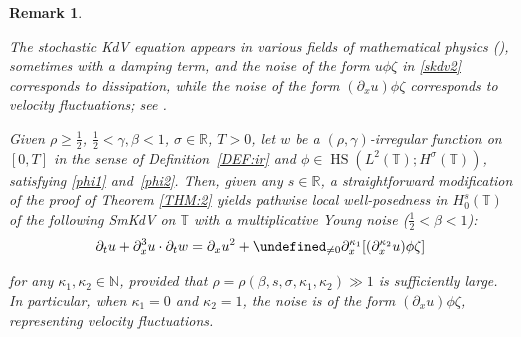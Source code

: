 \documentclass[letterpaper, 11pt,  reqno]{amsart}
\newtheorem{remark}[theorem]{Remark}
\DeclareMathOperator{\HS}{HS}
\newcommand{\1}{\hspace{0.5mm}\textup{I}\hspace{0.5mm}}
\newcommand{\noi}{\noindent}
\newcommand{\R}{\mathbb{R}}
\newcommand{\T}{\mathbb{T}}
\let\P= \undefined
\newcommand{\P}{\mathbf{P}}
\newcommand{\be}{\beta}
\newcommand{\kk}{\kappa}
\newcommand{\g}{\gamma}
\newcommand{\s}{\sigma}
\newcommand{\dx}{\partial_x}
\newcommand{\dt}{\partial_t}
\newcommand{\N}{\mathbb{N}}
\newcommand{\z}{\zeta}
\numberwithin{equation}{section}
\numberwithin{theorem}{section}
\begin{document}
 





\begin{remark}\label{REM:deriv}\rm


The stochastic KdV equation appears in various fields of mathematical physics
(\cite{BKKS, Herman, Gar}), sometimes with a damping term, 
and 
the noise of the form $u \phi \z$ in \eqref{skdv2} %
 corresponds to dissipation,
while the noise of the form
$(\dx u) \phi \z$ 
corresponds to velocity fluctuations; see \cite[pp.\,84-85]{BKKS}.


Given 
$\rho \ge\frac 12$,
$\frac 12 < \g, \be < 1$, $ \s \in \R$, $T > 0$, 
let 
$w$ be 
 a $(\rho,\g)$-irregular function on $[0, T]$ in the sense of Definition~\ref{DEF:ir}
 and 
$\phi \in \HS(L^2(\T); H^\s(\T))$, satisfying 
\eqref{phi1} and~\eqref{phi2}.
Then, given any $s \in \R$, 
a straightforward modification of the proof of Theorem \ref{THM:2}
yields pathwise local well-posedness 
in $H^s_0(\T)$ of the following SmKdV
on $\T$
with a multiplicative Young noise ($\frac 12 < \be < 1$):
\begin{align*}
\dt u+  \dx^3 u \cdot \dt w = \dx u^2 + \P_{\ne 0}\dx^{\kk_1}[(\dx^{\kk_2}u) \phi \zeta]
\end{align*}



\noi
for any $\kk_1, \kk_2 \in \N$, 
provided that $\rho = \rho(\be,  s, \s, \kk_1, \kk_2)\gg1$
is sufficiently large.
In particular, 
when $\kk_1 =0$ and  $\kk_2 = 1$, 
the noise 
is of the form 
$(\dx u) \phi \z$, 
representing velocity fluctuations.












%
%


\end{remark}
	
\end{document}
